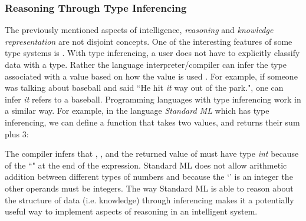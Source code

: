 \subsubsection{Reasoning Through Type Inferencing}
The previously mentioned aspects of intelligence, \textit{reasoning} and \textit{knowledge representation} are not disjoint concepts. One of the interesting features of some type systems is . With type inferencing, a user does not have to explicitly classify data with a type. Rather the language interpreter/compiler can infer the type associated with a value based on how the value is used \citep{sethi:proglang, pierce:types}. For example, if someone was talking about baseball and said ``He hit \textit{it} way out of the park.", one can infer \textit{it} refers to a baseball. Programming languages with type inferencing work in a similar way. For example, in the language \textit{Standard ML} which has type inferencing, we can define a function  that takes two values, and returns their sum plus 3: 
\begin{center}\end{center}
The compiler infers that , , and the returned value of  must have type \textit{int} because of the ``" at the end of the expression. Standard ML does not allow arithmetic addition between different types of numbers and because the `' is an integer the other operands must be integers. The way Standard ML is able to reason about the structure of data (i.e. knowledge) through inferencing makes it a potentially useful way to implement aspects of reasoning in an intelligent system.

